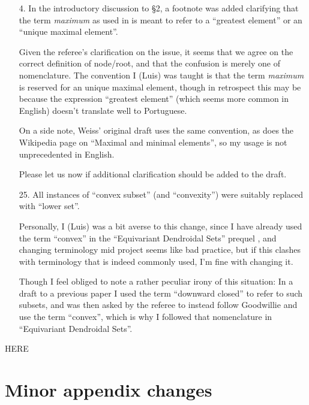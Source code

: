 \documentclass{article}
\begin{document}

\begin{itemize}
	\item[4.] In the introductory discussion to \S 2,
	a footnote was added clarifying that the term 
	\emph{maximum} as used in \cite{Per18}
	is meant to refer to a ``greatest element'' or 
	an ``unique maximal element''.
	
	Given the referee's clarification on the issue, 
	it seems that we agree on the correct definition of node/root,
	and that the confusion is merely one of nomenclature.
	The convention I (Luis) was taught is that the term \emph{maximum}
	is reserved for an unique maximal element,
	though in retrospect this may be because the expression 
	``greatest element'' (which seems more common in English) doesn't translate well to Portuguese.
	
	On a side note, Weiss' original draft \cite{Wei12}
	uses the same convention, 
	as does the Wikipedia page on ``Maximal and minimal elements'',
	so my usage is not unprecedented in English.
	
	Please let us now if additional clarification should be added to the draft.
	
	\item[25.] All instances of ``convex subset'' (and ``convexity'') were suitably replaced with ``lower set''.
	
	Personally, I (Luis) was a bit averse to this change,
	since I have already used the term ``convex'' in the
	``Equivariant Dendroidal Sets'' prequel \cite{Per18},
	and changing terminology mid project seems like bad practice,
	but if this clashes with terminology that is indeed commonly used, I'm fine with changing it.
	
	Though I feel obliged to note a rather peculiar irony of this situation:
	In a draft to a previous paper I used the term
	``downward closed'' to refer to such subsets,
	and was then asked by the referee to 
	instead follow Goodwillie and use the term ``convex'',
	which is why I followed that nomenclature in 
	``Equivariant Dendroidal Sets''.
\end{itemize}




{\color{red} HERE}

\section{Minor appendix changes}
\end{document}
